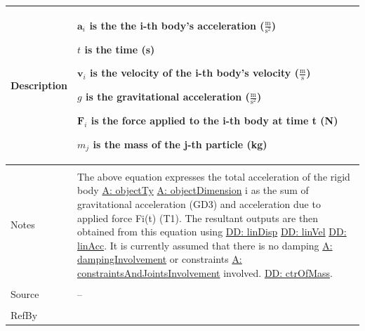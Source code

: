 \documentclass[12pt]{article}
\begin{document}
\begin{minipage}{\textwidth}
\begin{tabular}{>{\raggedright}p{}>{\raggedright\arraybackslash}p{}}
          Description & \begin{symbDescription}
                        \item{${\mathbf{a}_{i}}$ is the the i-th body's acceleration ($\frac{\text{m}}{\text{s}^{2}}$)}
                        \item{$t$ is the time (s)}
                        \item{${\mathbf{v}_{i}}$ is the velocity of the i-th body's velocity ($\frac{\text{m}}{\text{s}}$)}
                        \item{$g$ is the gravitational acceleration ($\frac{\text{m}}{\text{s}^{2}}$)}
                        \item{${\mathbf{F}_{i}}$ is the force applied to the i-th body at time t (N)}
                        \item{${m_{j}}$ is the mass of the j-th particle (kg)}
                        \end{symbDescription}
          \\ \midrule \\
          Notes & The above equation expresses the total acceleration of the rigid body \hyperref[assumpOT]{A: objectTy} \hyperref[assumpOD]{A: objectDimension} i as the sum of gravitational acceleration (GD3) and acceleration due to applied force Fi(t) (T1). The resultant outputs are then obtained from this equation using \hyperref[DD:linDisp]{DD: linDisp} \hyperref[DD:linVel]{DD: linVel} \hyperref[DD:linAcc]{DD: linAcc}.  It is currently assumed that there is no damping \hyperref[assumpDI]{A: dampingInvolvement} or constraints \hyperref[assumpCAJI]{A: constraintsAndJointsInvolvement} involved. \hyperref[DD:ctrOfMass]{DD: ctrOfMass}.
          \\ \midrule \\
          Source & --
          \\ \midrule \\
          RefBy & 
          \\ \bottomrule
          \end{tabular}
          \end{minipage}
\par~
\end{document}
